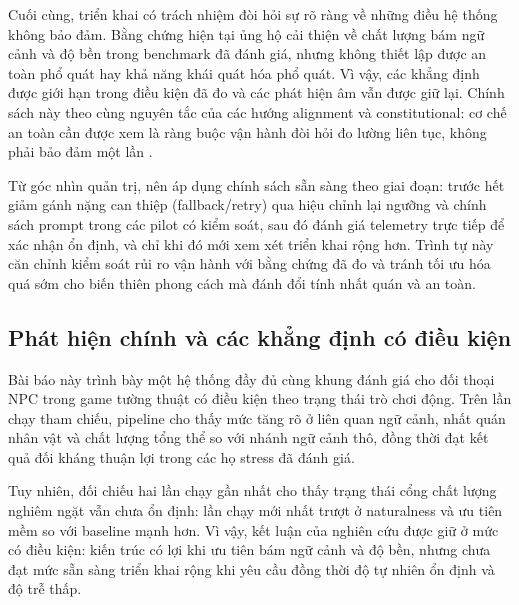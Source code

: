﻿\documentclass[a4paper,12pt]{article}
\begin{document}
Cuối cùng, triển khai có trách nhiệm đòi hỏi sự rõ ràng về những điều hệ thống không bảo đảm. Bằng chứng hiện tại ủng hộ cải thiện về chất lượng bám ngữ cảnh và độ bền trong benchmark đã đánh giá, nhưng không thiết lập được an toàn phổ quát hay khả năng khái quát hóa phổ quát. Vì vậy, các khẳng định được giới hạn trong điều kiện đã đo và các phát hiện âm vẫn được giữ lại. Chính sách này theo cùng nguyên tắc của các hướng alignment và constitutional: cơ chế an toàn cần được xem là ràng buộc vận hành đòi hỏi đo lường liên tục, không phải bảo đảm một lần \cite{Bai2022Constitutional}.

Từ góc nhìn quản trị, nên áp dụng chính sách sẵn sàng theo giai đoạn: trước hết giảm gánh nặng can thiệp (fallback/retry) qua hiệu chỉnh lại ngưỡng và chính sách prompt trong các pilot có kiểm soát, sau đó đánh giá telemetry trực tiếp để xác nhận ổn định, và chỉ khi đó mới xem xét triển khai rộng hơn. Trình tự này căn chỉnh kiểm soát rủi ro vận hành với bằng chứng đã đo và tránh tối ưu hóa quá sớm cho biến thiên phong cách mà đánh đổi tính nhất quán và an toàn.

\subsection{Phát hiện chính và các khẳng định có điều kiện}
Bài báo này trình bày một hệ thống đầy đủ cùng khung đánh giá cho đối thoại NPC trong game tường thuật có điều kiện theo trạng thái trò chơi động. Trên lần chạy tham chiếu, pipeline cho thấy mức tăng rõ ở liên quan ngữ cảnh, nhất quán nhân vật và chất lượng tổng thể so với nhánh ngữ cảnh thô, đồng thời đạt kết quả đối kháng thuận lợi trong các họ stress đã đánh giá.

Tuy nhiên, đối chiếu hai lần chạy gần nhất cho thấy trạng thái cổng chất lượng nghiêm ngặt vẫn chưa ổn định: lần chạy mới nhất trượt ở naturalness và ưu tiên mềm so với baseline mạnh hơn. Vì vậy, kết luận của nghiên cứu được giữ ở mức có điều kiện: kiến trúc có lợi khi ưu tiên bám ngữ cảnh và độ bền, nhưng chưa đạt mức sẵn sàng triển khai rộng khi yêu cầu đồng thời độ tự nhiên ổn định và độ trễ thấp.
\end{document}
